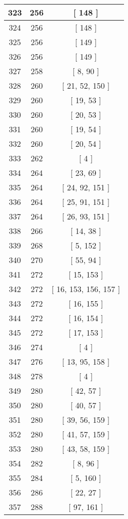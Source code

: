 \begin{center}
\begin{longtable}[H]{|| c c c ||}
\hline
323 & 256 & [ 148 ] \\ 
\hline
324 & 256 & [ 148 ] \\ 
\hline
325 & 256 & [ 149 ] \\ 
\hline
326 & 256 & [ 149 ] \\ 
\hline
327 & 258 & [ 8, 90 ] \\ 
\hline
328 & 260 & [ 21, 52, 150 ] \\ 
\hline
329 & 260 & [ 19, 53 ] \\ 
\hline
330 & 260 & [ 20, 53 ] \\ 
\hline
331 & 260 & [ 19, 54 ] \\ 
\hline
332 & 260 & [ 20, 54 ] \\ 
\hline
333 & 262 & [ 4 ] \\ 
\hline
334 & 264 & [ 23, 69 ] \\ 
\hline
335 & 264 & [ 24, 92, 151 ] \\ 
\hline
336 & 264 & [ 25, 91, 151 ] \\ 
\hline
337 & 264 & [ 26, 93, 151 ] \\ 
\hline
338 & 266 & [ 14, 38 ] \\ 
\hline
339 & 268 & [ 5, 152 ] \\ 
\hline
340 & 270 & [ 55, 94 ] \\ 
\hline
341 & 272 & [ 15, 153 ] \\ 
\hline
342 & 272 & [ 16, 153, 156, 157 ] \\ 
\hline
343 & 272 & [ 16, 155 ] \\ 
\hline
344 & 272 & [ 16, 154 ] \\ 
\hline
345 & 272 & [ 17, 153 ] \\ 
\hline
346 & 274 & [ 4 ] \\ 
\hline
347 & 276 & [ 13, 95, 158 ] \\ 
\hline
348 & 278 & [ 4 ] \\ 
\hline
349 & 280 & [ 42, 57 ] \\ 
\hline
350 & 280 & [ 40, 57 ] \\ 
\hline
351 & 280 & [ 39, 56, 159 ] \\ 
\hline
352 & 280 & [ 41, 57, 159 ] \\ 
\hline
353 & 280 & [ 43, 58, 159 ] \\ 
\hline
354 & 282 & [ 8, 96 ] \\ 
\hline
355 & 284 & [ 5, 160 ] \\ 
\hline
356 & 286 & [ 22, 27 ] \\ 
\hline
357 & 288 & [ 97, 161 ] \\ 

\end{longtable}
\end{center}
